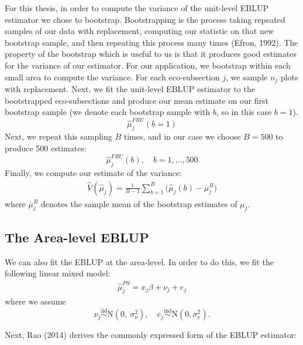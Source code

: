 \documentclass[12pt,twoside]{reedthesis}
\begin{document}
For this thesis, in order to compute the variance of the unit-level EBLUP estimator we chose to bootstrap. Bootstrapping is the process taking repeated samples of our data with replacement, computing our statistic on that new bootstrap sample, and then repeating this process many times (Efron, 1992). The property of the bootstrap which is useful to us is that it produces good estimates for the variance of our estimator. For our application, we bootstrap within each small area to compute the variance. For each eco-subsection \(j\), we sample \(n_j\) plots with replacement. Next, we fit the unit-level EBLUP estimator to the bootstrapped eco-subsections and produce our mean estimate on our first bootstrap sample (we denote each bootstrap sample with \(b\), so in this case \(b=1\)).
\[
\hat\mu_j^{FRU}(b=1)
\]
Next, we repeat this sampling \(B\) times, and in our case we choose \(B = 500\) to produce 500 estimates:
\[
\hat\mu_j^{FRU}(b), \quad b = 1,\dots,500
\]
Finally, we compute our estimate of the variance:
\begin{align}
\hat V(\hat\mu_j) = \frac{1}{B-1} \sum_{b=1}^{B}\Big(\hat\mu_j(b) - \overline\mu_j^B\Big)
\end{align}
where \(\overline\mu_j^B\) denotes the sample mean of the bootstrap estimates of \(\mu_j\).

\hypertarget{the-area-level-eblup}{%
\subsection{The Area-level EBLUP}\label{the-area-level-eblup}}

We can also fit the EBLUP at the area-level. In order to do this, we fit the following linear mixed model:
\begin{align}
\hat\mu_{j}^{PS} = x_j \beta + \nu_j + e_j \label{eq:area-mod}
\end{align}
where we assume
\[
 \newcommand\myeq{\stackrel{\mathclap{\normalfont\mbox{s}}}{~}}
\nu_j \stackrel{\text{iid}}{\sim} \text{N}(0,~ \sigma^2_{\nu}), \quad e_{j} \stackrel{\text{ind}}{\sim}\text{N}(0, \sigma^2_e).
\]

Next, Rao (2014) derives the commonly expressed form of the EBLUP estimator:
\end{document}
